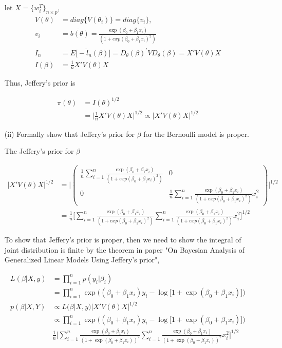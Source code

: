 \begin{itemize}
let $X = \{ w_i^{T}\}_{n \times p}$, 
\begin{align*}
V(\theta) & = diag \{ V(\theta_i) \} = diag \{ v_i \} ,\\
v_i &= \ddot{b(\theta)} = \frac{\exp(\beta_0 + \beta_1 x_i)}{(1 + exp(\beta_0+ \beta_1 x_i)^2)}\\
I_n &= E \Big[ -\ddot{l}_n(\beta) \Big] =  D_{\theta}(\beta)^{'} V D_{\theta}(\beta) =  X' V(\theta) X \\
I(\beta) &= \frac{1}{n} X' V(\theta) X
\end{align*}

Thus, Jeffery's prior is 

\begin{align*}
	\pi(\theta) & = I(\theta)^{1/2}  \\
	&= \Big| \frac{1}{n} X' V(\theta) X \Big |^{1/2} \propto   | X' V(\theta) X | ^{1/2}
\end{align*}	

\item[(ii)] Formally show that Jeffery's prior for $\beta$ for the Bernoulli model is proper. 

The Jeffery's prior for $\beta$

\begin{align*}
   | X' V(\theta) X | ^{1/2} &= \Biggl | \begin{pmatrix} 
   \frac{1}{n} \sum_{i=1}^n \frac{\exp(\beta_0 + \beta_1 x_i)}{(1 + exp(\beta_0+ \beta_1 x_i)^2)} &  0 \\
   0 &\frac{1}{n} \sum_{i=1}^n \frac{\exp(\beta_0 + \beta_1 x_i)}{(1 + exp(\beta_0+ \beta_1 x_i)^2)} x_i^2
   \end{pmatrix} \Biggl | ^{1/2} \\
   &= \frac{1}{n} \Big[ \sum_{i=1}^n \frac{\exp(\beta_0 + \beta_1 x_i)}{(1 + exp(\beta_0+ \beta_1 x_i)^2)} \sum_{i=1}^n \frac{\exp(\beta_0 + \beta_1 x_i)}{(1 + exp(\beta_0+ \beta_1 x_i)^2)} x_i^2 \Big]^{1/2}
\end{align*}

To show that Jeffery's prior is proper, then we need to show the integral of joint distribution is finite by the theorem in paper "On Bayesian Analysis of Generalized Linear Models Using Jeffery's prior",

\begin{align*}
   L(\beta| X, y) &= \prod_{i=1}^n p(y_i | \beta_i) \\
   &=  \prod_{i=1}^n \exp \Big(  (\beta_0 + \beta_1 x_i) y_i -\log \Big[ 1 + \exp(\beta_0 + \beta_1 x_i) \Big] \Big) \\
   p(\beta| X, Y)  & \propto L(\beta| X, y)  | X' V(\theta) X | ^{1/2} \\
   & \propto  \prod_{i=1}^n \exp \Big(  (\beta_0 + \beta_1 x_i) y_i -\log \Big[ 1 + \exp(\beta_0 + \beta_1 x_i) \Big] \Big)\\
   & \frac{1}{n} \Big[ \sum_{i=1}^n \frac{\exp(\beta_0 + \beta_1 x_i)}{(1 + \exp(\beta_0+ \beta_1 x_i))^2} \sum_{i=1}^n \frac{\exp(\beta_0 + \beta_1 x_i)}{(1 + \exp(\beta_0+ \beta_1 x_i))^2} x_i^2 \Big]^{1/2}
\end{align*}


\end{itemize}
